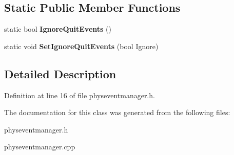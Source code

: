 \subsection*{Static Public Member Functions}
\begin{DoxyCompactItemize}
\item 
\hypertarget{classPhysEventManager_a9783a16342acd71c9a11ade41a2e226b}{
static bool {\bfseries IgnoreQuitEvents} ()}
\label{d5/dd7/classPhysEventManager_a9783a16342acd71c9a11ade41a2e226b}

\item 
\hypertarget{classPhysEventManager_acc902586015a3cd903d14cb20cd51386}{
static void {\bfseries SetIgnoreQuitEvents} (bool Ignore)}
\label{d5/dd7/classPhysEventManager_acc902586015a3cd903d14cb20cd51386}

\end{DoxyCompactItemize}


\subsection{Detailed Description}


Definition at line 16 of file physeventmanager.h.

The documentation for this class was generated from the following files:\begin{DoxyCompactItemize}
\item 
physeventmanager.h\item 
physeventmanager.cpp\end{DoxyCompactItemize}
